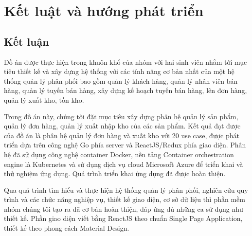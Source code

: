 \chapter{Kết luật và hướng phát triển}
\section{Kết luận}
Đồ án được thực hiện trong khuôn khổ của nhóm với hai sinh viên
nhắm tới mục tiêu thiết kế và xây dựng hệ thống với các tính năng
cơ bản nhất của một hệ thống quản lý phân phối bao gồm quản lý
khách hàng, quản lý nhân viên bán hàng, quản lý tuyến bán hàng,
xây dựng kế hoạch tuyến bán hàng, lên đơn hàng, quản lý xuất kho,
tồn kho.

Trong đồ án này, chúng tôi đặt mục tiêu xây dựng phân hệ
quản lý sản phẩm, quản lý đơn hàng, quản lý xuất nhập kho
của các sản phẩm. Kết quả đạt được của đồ án là phân hệ
quản lý đơn hàng và xuất kho với 20 use case, được phát triển
dựa trên công nghệ Go phía server và ReactJS/Redux phía giao
diện. Phân hệ đã sử dụng công nghệ container Docker,
nền tảng Container orchestration engine là Kubernetes và
sử dụng dịch vụ cloud Microsoft Azure để triển khai
và thử nghiệm ứng dụng. Quá trình triển khai ứng dụng đã
được hoàn thiện.

Qua quá trình tìm hiểu và thực hiện hệ thống quản lý phân phối,
nghiên cứu quy trình và các chức năng nghiệp vụ, thiết kế giao
diện, cơ sở dữ liệu thì phần mềm nhóm chúng tôi tạo ra đã cơ bản hoàn
thiện, đáp ứng đủ những ca sử dụng như thiết kế. Phần giao diện
viết bằng ReactJS theo chuẩn Single Page Application, thiết kế theo
phong cách Material Design. 

